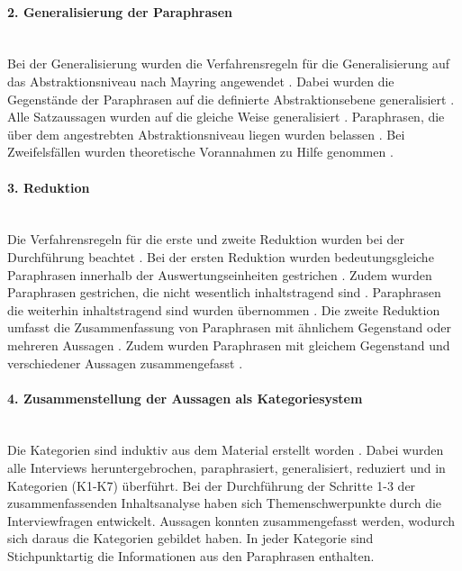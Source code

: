 \paragraph{2. Generalisierung der Paraphrasen}\mbox{} \\
Bei der Generalisierung wurden die Verfahrensregeln für die Generalisierung auf das Abstraktionsniveau nach Mayring angewendet \cite{mayring2019qualitative}. Dabei wurden die Gegenstände der Paraphrasen auf die definierte Abstraktionsebene generalisiert \cite{mayring2019qualitative}. Alle Satzaussagen wurden auf die gleiche Weise generalisiert \cite{mayring2019qualitative}. Paraphrasen, die über dem angestrebten Abstraktionsniveau liegen wurden belassen \cite{mayring2019qualitative}. Bei Zweifelsfällen wurden theoretische Vorannahmen zu Hilfe genommen \cite{mayring2019qualitative}.
\paragraph{3. Reduktion}\mbox{} \\
Die Verfahrensregeln für die erste und zweite Reduktion wurden bei der Durchführung beachtet \cite{mayring2019qualitative}. Bei der ersten Reduktion wurden bedeutungsgleiche Paraphrasen innerhalb der Auswertungseinheiten gestrichen \cite{mayring2019qualitative}. Zudem wurden Paraphrasen gestrichen, die nicht wesentlich inhaltstragend sind \cite{mayring2019qualitative}. Paraphrasen die weiterhin inhaltstragend sind wurden übernommen \cite{mayring2019qualitative}. Die zweite Reduktion umfasst die Zusammenfassung von Paraphrasen mit ähnlichem Gegenstand oder mehreren Aussagen \cite{mayring2019qualitative}. Zudem wurden Paraphrasen mit gleichem Gegenstand und verschiedener Aussagen zusammengefasst \cite{mayring2019qualitative}.
\paragraph{4. Zusammenstellung der Aussagen als Kategoriesystem}\mbox{} \\
\label{sec:kategorien}
Die Kategorien sind induktiv aus dem Material erstellt worden \cite{mayring2012qualitative}. Dabei wurden alle Interviews heruntergebrochen, paraphrasiert, generalisiert, reduziert und in Kategorien (K1-K7) überführt. Bei der Durchführung der Schritte 1-3 der zusammenfassenden Inhaltsanalyse haben sich Themenschwerpunkte durch die Interviewfragen entwickelt. Aussagen konnten zusammengefasst werden, wodurch sich daraus die Kategorien gebildet haben. In jeder Kategorie sind Stichpunktartig die Informationen aus den Paraphrasen enthalten. \\

